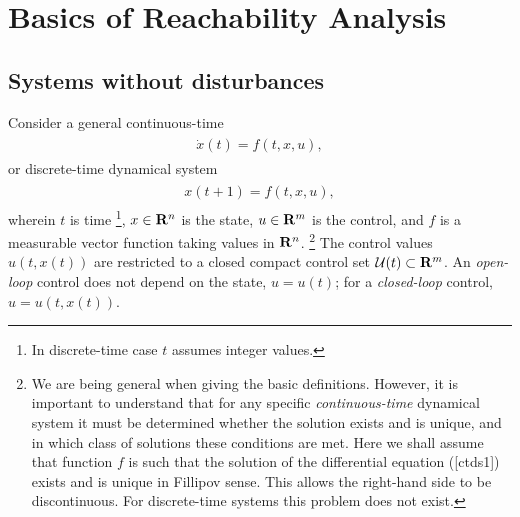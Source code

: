 \documentclass[letterpaper,10pt,english]{sphinxmanual}
\begin{document}
\section{Basics of Reachability Analysis}
\label{chap_reach:basics-of-reachability-analysis}

\subsection{Systems without disturbances}
\label{chap_reach:systems-without-disturbances}
Consider a general continuous-time
\label{chap_reach:equation-ctds1}\begin{gather}
\begin{split}\dot{x}(t) = f(t, x, u),\end{split}\label{chap_reach-ctds1}
\end{gather}
or discrete-time dynamical system
\label{chap_reach:equation-dtds1}\begin{gather}
\begin{split}x(t+1) = f(t, x, u),\end{split}\label{chap_reach-dtds1}
\end{gather}
wherein $t$ is time \footnote{
In discrete-time case $t$ assumes integer values.
}, $x\in{\bf R}^n$ is the state,
$u\in{\bf R}^m$ is the control, and $f$ is a measurable
vector function taking values in ${\bf R}^n$. \footnote{
We are being general when giving the basic definitions. However, it
is important to understand that for any specific \emph{continuous-time}
dynamical system it must be determined whether the solution exists
and is unique, and in which class of solutions these conditions are
met. Here we shall assume that function $f$ is such that the
solution of the differential equation ({[}ctds1{]}) exists and is unique
in Fillipov sense. This allows the right-hand side to be
discontinuous. For discrete-time systems this problem does not exist.
} The control
values $u(t, x(t))$ are restricted to a closed compact control set
${\mathcal U}(t)\subset{\bf R}^m$. An \emph{open-loop} control does not
depend on the state, $u=u(t)$; for a \emph{closed-loop} control,
$u=u(t, x(t))$.
\end{document}
